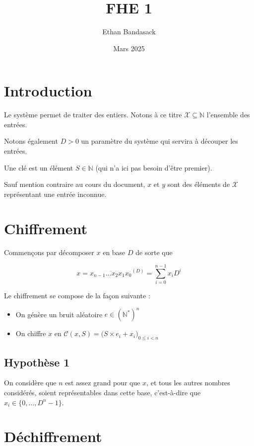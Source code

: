 \documentclass{article}
\title{FHE 1}
\author{Ethan Bandasack}
\date{Mars 2025}
\begin{document}
\maketitle

\setlength{\parindent}{0cm}
\setlength{\parskip}{0.2cm}

\section{Introduction}

Le système permet de traiter des entiers. Notons à ce titre $\mathcal{X} \subseteq \mathbb{N}$ l’ensemble des entrées.

Notons également $D > 0$ un paramètre du système qui servira à découper les entrées.

Une clé est un élément $S \in \mathbb{N}$ (qui n’a ici pas besoin d’être premier).

Sauf mention contraire au cours du document, $x$ et $y$ sont des éléments de $\mathcal{X}$ représentant une entrée inconnue.


\section{Chiffrement}

Commençons par décomposer $x$ en base $D$ de sorte que

\begin{equation}
\label{decomposition}
    x = \displaystyle\overline{x_{n-1}\ldots x_{2} x_{1} x_{0}}^{(D)} = \sum_{i=0}^{n-1}x_{i} D^i
\end{equation}

Le chiffrement se compose de la façon suivante :
\begin{itemize}
    \item On génère un bruit aléatoire $e \in (\mathbb{N}^*)^n$
    \item On chiffre $x$ en $\mathcal{C}(x, S) = \Big( S \times e_i + x_i \Big)_{0\le i < n}$
\end{itemize}

\subsection{Hypothèse 1}
\label{hypothese1}
On considère que $n$ est assez grand pour que $x$, et tous les autres nombres considérés, soient représentables dans cette base, c’est-à-dire que $x_i \in \{0, \ldots, D^n-1\}$.

\section{Déchiffrement}
\end{document}
